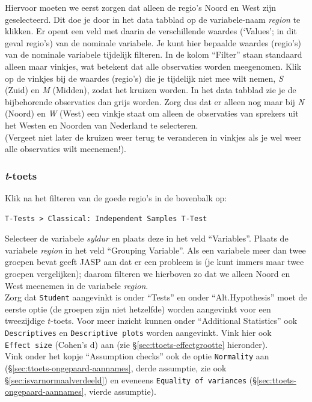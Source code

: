 \documentclass[
]{book}
\begin{document}
Hiervoor moeten we eerst zorgen dat alleen de regio's Noord en West zijn geselecteerd. Dit doe je door in het data tabblad op de variabele-naam \emph{region} te klikken. Er opent een veld met daarin de verschillende waardes (`Values'; in dit geval regio's) van de nominale variabele. Je kunt hier bepaalde waardes (regio's) van de nominale variabele tijdelijk filteren. In de kolom ``Filter'' staan standaard alleen maar vinkjes, wat betekent dat alle observaties worden meegenomen. Klik op de vinkjes bij de waardes (regio's) die je tijdelijk niet mee wilt nemen, \emph{S} (Zuid) en \emph{M} (Midden), zodat het kruizen worden. In het data tabblad zie je de bijbehorende observaties dan grijs worden. Zorg dus dat er alleen nog maar bij \emph{N} (Noord) en \emph{W} (West) een vinkje staat om alleen de observaties van sprekers uit het Westen en Noorden van Nederland te selecteren.\\
(Vergeet niet later de kruizen weer terug te veranderen in vinkjes als je wel weer alle observaties wilt meenemen!).

\hypertarget{t-toets}{%
\subsubsection{\texorpdfstring{\emph{t}-toets}{t-toets}}\label{t-toets}}

Klik na het filteren van de goede regio's in de bovenbalk op:

\begin{verbatim}
T-Tests > Classical: Independent Samples T-Test
\end{verbatim}

Selecteer de variabele \emph{syldur} en plaats deze in het veld ``Variables''. Plaats de variabele \emph{region} in het veld ``Grouping Variable''. Als een variabele meer dan twee groepen bevat geeft JASP aan dat er een probleem is (je kunt immers maar twee groepen vergelijken); daarom filteren we hierboven zo dat we alleen Noord en West meenemen in de variabele \emph{region}.\\
Zorg dat \texttt{Student} aangevinkt is onder ``Tests'' en onder ``Alt.Hypothesis'' moet de eerste optie (de groepen zijn niet hetzelfde) worden aangevinkt voor een tweezijdige \(t\)-toets. Voor meer inzicht kunnen onder ``Additional Statistics'' ook \texttt{Descriptives} en \texttt{Descriptive\ plots} worden aangevinkt. Vink hier ook \texttt{Effect\ size} (Cohen's d) aan (zie §\ref{sec:ttoets-effectgrootte} hieronder).\\
Vink onder het kopje ``Assumption checks'' ook de optie \texttt{Normality} aan (§\ref{sec:ttoets-ongepaard-aannames}, derde assumptie, zie ook §\ref{sec:isvarnormaalverdeeld}) en eveneens \texttt{Equality\ of\ variances} (§\ref{sec:ttoets-ongepaard-aannames}, vierde assumptie).
\end{document}
